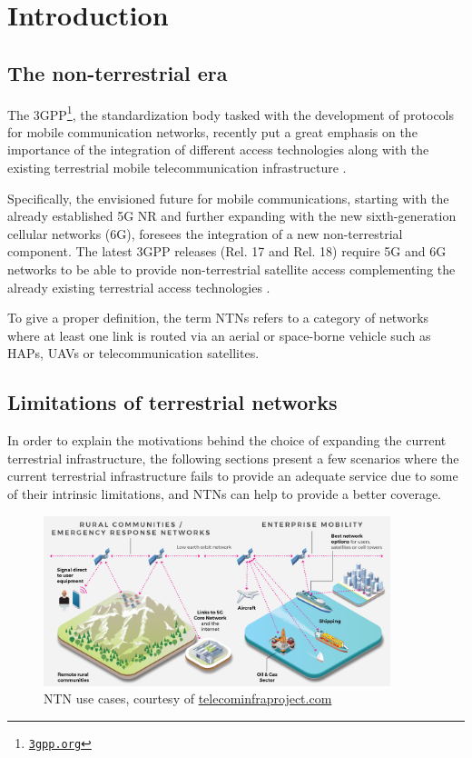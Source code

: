 
\chapter{Introduction}
\label{chp:intro}

\section{The non-terrestrial era}
The \ac{3GPP}\footnote{\href{https://www.3gpp.org}{\texttt{3gpp.org}}}, the standardization body tasked with the development of protocols for mobile communication networks, recently put a great emphasis on the importance of the integration of different access technologies along with the existing terrestrial mobile telecommunication infrastructure \cite{3gpp-tr-21.917}.

Specifically, the envisioned future for mobile communications, starting with the already established 5G \ac{NR} and further expanding with the new sixth-generation cellular networks (6G), foresees the integration of a new non-terrestrial component. The latest \ac{3GPP} releases (Rel. 17 and Rel. 18) require 5G and 6G networks to be able to provide non-terrestrial satellite access complementing the already existing terrestrial access technologies \cite{overview-rel-17-18-saad, 5g-nr-communication-geo-leo-maattanen}.

To give a proper definition, the term \ac{NTNs} refers to a category of networks where at least one link is routed via an aerial or space-borne vehicle such as \ac{HAPs}, \ac{UAVs} or telecommunication satellites.

\section{Limitations of terrestrial networks}
In order to explain the motivations behind the choice of expanding the current terrestrial infrastructure, the following sections present a few scenarios where the current terrestrial infrastructure fails to provide an adequate service due to some of their intrinsic limitations, and \ac{NTNs} can help to provide a better coverage.

\begin{figure}[ht]
    \centering
    \includegraphics[width=0.9\textwidth]{res/sat-usecases.png}
    \caption{NTN use cases, courtesy of \href{https://telecominfraproject.com/ntcs/}{telecominfraproject.com}}
    \label{fig:sat-use-cases}
\end{figure}

